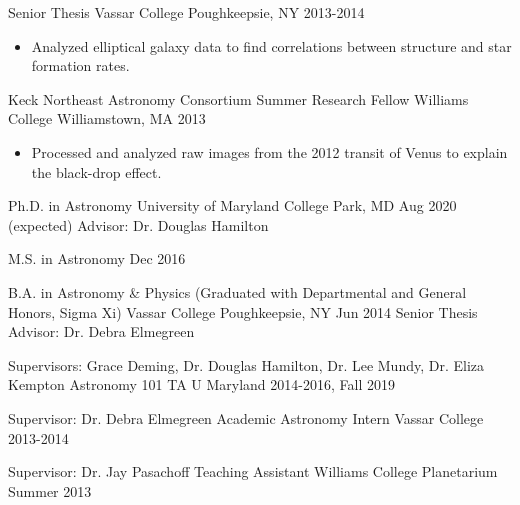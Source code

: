 \documentclass[]{awesome-cv}
\begin{document}
\begin{cventries}
	\vspace{-6mm}
	\cventry
	{Senior Thesis}
	{Vassar College}
	{Poughkeepsie, NY}
	{2013-2014}
	{\vspace{-3mm}
		\begin{itemize}
			\item Analyzed elliptical galaxy data to find correlations between structure and star formation rates.
	\end{itemize}
	}
	
	\vspace{-6mm}
	\cventry
	{Keck Northeast Astronomy Consortium Summer Research Fellow}
	{Williams College}
	{Williamstown, MA}
	{2013}
	{\vspace{-3mm}
		\begin{itemize}
			\item Processed and analyzed raw images from the 2012 transit of Venus to explain the black-drop effect.
	\end{itemize}}
\end{cventries}

\vspace{-7mm}

\begin{cventries}
	\cventry
	{Ph.D. in Astronomy}
	{University of Maryland}
	{College Park, MD}
	{Aug 2020 (expected)}
	{Advisor: Dr. Douglas Hamilton}
	
	\vspace{-2mm}
	\cventry
	{M.S. in Astronomy}
	{}
	{}
	{Dec 2016}
	{}
	
	\vspace{-5mm}
	\cventry
	{B.A. in Astronomy \& Physics (Graduated with Departmental and General Honors, Sigma Xi)}
	{Vassar College}
	{Poughkeepsie, NY}
	{Jun 2014}
	{Senior Thesis Advisor: Dr. Debra Elmegreen}
\end{cventries}

\vspace{-2mm}

\begin{cventries}

	\cventry
	{Supervisors: Grace Deming, Dr. Douglas Hamilton, Dr. Lee Mundy, Dr. Eliza Kempton}
	{Astronomy 101 TA}
	{U Maryland}
	{2014-2016, Fall 2019}
	{}
		
	\vspace{-6mm}
	\cventry
	{Supervisor: Dr. Debra Elmegreen}
	{Academic Astronomy Intern}
	{Vassar College}
	{2013-2014}
	{}
		
	\vspace{-6mm}
	\cventry
	{Supervisor: Dr. Jay Pasachoff}
	{Teaching Assistant}
	{Williams College Planetarium}
	{Summer 2013}
	{}
\end{cventries}



\end{document}
